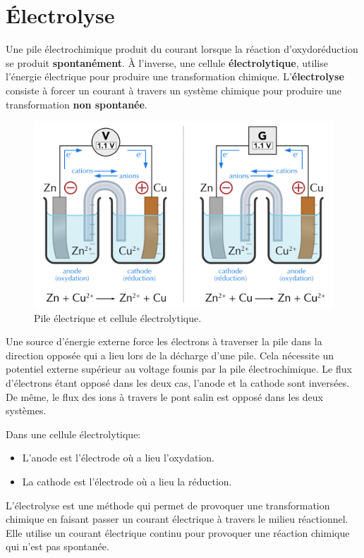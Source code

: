 \documentclass[
  11pt,
  a4paper,
  openany]{book}
\providecommand{\tightlist}{%
  \setlength{\itemsep}{0pt}\setlength{\parskip}{0pt}}
\begin{document}
\hypertarget{uxe9lectrolyse}{%
\section{Électrolyse}\label{uxe9lectrolyse}}

Une pile électrochimique produit du courant lorsque la réaction d'oxydoréduction se produit \textbf{spontanément}. À l'inverse, une cellule \textbf{électrolytique}, utilise l'énergie électrique pour produire une transformation chimique. L'\textbf{électrolyse} consiste à forcer un courant à travers un système chimique pour produire une transformation \textbf{non spontanée}.

\begin{figure}

{\centering \includegraphics[width=0.67\linewidth]{images/pile-recharge} 

}

\caption{Pile électrique et cellule électrolytique.}\label{fig:pile-recharge}
\end{figure}

Une source d'énergie externe force les électrons à traverser la pile dans la direction opposée qui a lieu lors de la décharge d'une pile. Cela nécessite un potentiel externe supérieur au voltage founis par la pile électrochimique. Le flux d'électrons étant opposé dans les deux cas, l'anode et la cathode sont inversées. De même, le flux des ions à travers le pont salin est opposé dans les deux systèmes.

Dans une cellule électrolytique:

\begin{itemize}
\tightlist
\item
  L'anode est l'électrode où a lieu l'oxydation.
\item
  La cathode est l'électrode où a lieu la réduction.
\end{itemize}

L'électrolyse est une méthode qui permet de provoquer une transformation chimique en faisant passer un courant électrique à travers le milieu réactionnel. Elle utilise un courant électrique continu pour provoquer une réaction chimique qui n'est pas spontanée.
\end{document}
